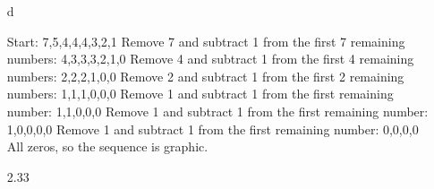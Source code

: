 \documentclass[12pt]{article}
\begin{document}
\begin{enumerate}
\item[d] 
\begin{center}
    Start: 7,5,4,4,4,3,2,1
    \newline
    Remove 7 and subtract 1 from the first 7 remaining numbers: 4,3,3,3,2,1,0
    \newline        
    Remove 4 and subtract 1 from the first 4 remaining numbers: 2,2,2,1,0,0
    \newline
    Remove 2 and subtract 1 from the first 2 remaining numbers: 1,1,1,0,0,0
    \newline        
    Remove 1 and subtract 1 from the first remaining number: 1,1,0,0,0
    \newline
    Remove 1 and subtract 1 from the first remaining number: 1,0,0,0,0
    \newline        
    Remove 1 and subtract 1 from the first remaining number: 0,0,0,0
    \newline
    All zeros, so the sequence is graphic.

\end{center}
\item[2.33]


\end{enumerate}
\end{document}

